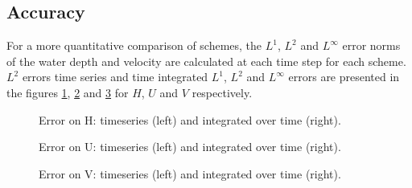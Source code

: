 \subsection{Accuracy}

For a more quantitative comparison of schemes, the $L^1$, $L^2$ and $L^\infty$ error norms
of the water depth and velocity are calculated at each time step for each scheme.
$L^2$ errors time series and time integrated $L^1$, $L^2$ and $L^\infty$ errors are presented in the figures \ref{fig:thacker:ErrNumH}, \ref{fig:thacker:ErrNumU} and \ref{fig:thacker:ErrNumV} for $H$, $U$ and $V$ respectively.

\begin{figure}[H]
\begin{minipage}[t]{0.45\textwidth}
 \centering
\end{minipage}%
\begin{minipage}[t]{0.55\textwidth}
 \centering
\end{minipage}
  \caption{Error on H: timeseries (left) and integrated over time (right).}
  \label{fig:thacker:ErrNumH}
\end{figure}

\begin{figure}[H]
\begin{minipage}[t]{0.45\textwidth}
 \centering
\end{minipage}%
\begin{minipage}[t]{0.55\textwidth}
 \centering
\end{minipage}
  \caption{Error on U: timeseries (left) and integrated over time (right).}
  \label{fig:thacker:ErrNumU}
\end{figure}

\begin{figure}[H]
\begin{minipage}[t]{0.45\textwidth}
 \centering
\end{minipage}%
\begin{minipage}[t]{0.55\textwidth}
 \centering
\end{minipage}
  \caption{Error on V: timeseries (left) and integrated over time (right).}
  \label{fig:thacker:ErrNumV}
\end{figure}

